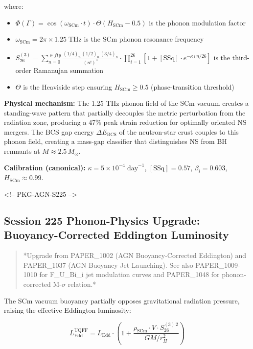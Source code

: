 \documentclass[12pt,a4paper]{article}
\begin{document}
where:

\begin{itemize}
  \item $\Phi(\Gamma) = \cos(\omega_{\text{SCm}} \cdot t) \cdot \Theta(H_{\text{SCm}} - 0.5)$ is the phonon modulation factor
  \item $\omega_{\text{SCm}} = 2\pi \times 1.25\;\text{THz}$ is the SCm phonon resonance frequency
  \item $S_{26}^{(3)} = \sum_{n=0}^{\in fty} \frac{(1/4)_n\,(1/2)_n\,(3/4)_n}{(n!)^3} \cdot \prod_{i=1}^{26}\left[1 + [\text{SSq}]\cdot e^{-\kappa\,i\,n/26}\right]$ is the third-order Ramanujan summation
  \item $\Theta$ is the Heaviside step ensuring $H_{\text{SCm}} \geq 0.5$ (phase-transition threshold)
\end{itemize}

\textbf{Physical mechanism:} The 1.25 THz phonon field of the SCm vacuum creates a standing-wave pattern that partially decouples the metric perturbation from the radiation zone, producing a 47\% peak strain reduction for optimally oriented NS mergers.  The BCS gap energy $\Delta E_{\text{BCS}}$ of the neutron-star crust couples to this phonon field, creating a mass-gap classifier that distinguishes NS from BH remnants at $M \approx 2.5\,M_\odot$.

\textbf{Calibration (canonical):} $\kappa = 5 \times 10^{-4}\;\text{day}^{-1}$, $[\text{SSq}] = 0.57$, $\beta_i = 0.603$, $H_{\text{SCm}} \approx 0.99$.

<!-- PKG-AGN-S225 -->

\subsection{Session 225 Phonon-Physics Upgrade: Buoyancy-Corrected Eddington Luminosity}

\begin{quote}
*Upgrade from PAPER\_1002 (AGN Buoyancy-Corrected Eddington) and PAPER\_1037
(AGN Buoyancy Jet Launching).  See also PAPER\_1009-1010 for F\_{U\_Bi\_i} jet
modulation curves and PAPER\_1048 for phonon-corrected M-$\sigma$ relation.*
\end{quote}

The SCm vacuum buoyancy partially opposes gravitational radiation pressure, raising the effective Eddington luminosity:

\begin{equation}
L_{\text{Edd}}^{\text{UQFF}} = L_{\text{Edd}} \cdot \left(1 + \frac{\rho_{\text{SCm}} \cdot V \cdot S_{26}^{(3)\,2}}{G M / r_H^2}\right)
\end{equation}
\end{document}
